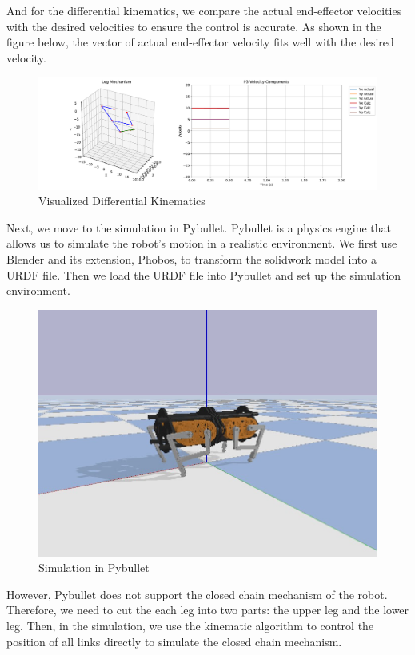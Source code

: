 \documentclass[a4paper,11pt]{article}
\begin{document}
And for the differential kinematics, we compare the actual end-effector velocities with the desired velocities to ensure the control is accurate.
As shown in the figure below, the vector of actual end-effector velocity fits well with the desired velocity.

\begin{figure}[H]
  \centering
	\includegraphics[width=\linewidth]{../../assets/differential_kinematics.pdf}
  \caption{Visualized Differential Kinematics}
  \label{fig:diff}
\end{figure}

Next, we move to the simulation in Pybullet.
Pybullet is a physics engine that allows us to simulate the robot's motion in a realistic environment.
We first use Blender and its extension, Phobos, to transform the solidwork model into a URDF file.
Then we load the URDF file into Pybullet and set up the simulation environment.

\begin{figure}[H]
  \centering
	\includegraphics[width=0.6\linewidth]{../../assets/pybullet.jpg}
  \caption{Simulation in Pybullet}
  \label{fig:bullet}
\end{figure}

However, Pybullet does not support the closed chain mechanism of the robot. Therefore, we need to 
cut the each leg into two parts: the upper leg and the lower leg. Then, in the simulation, 
we use the kinematic algorithm to control the position of all links directly to simulate the
closed chain mechanism.
\end{document}
